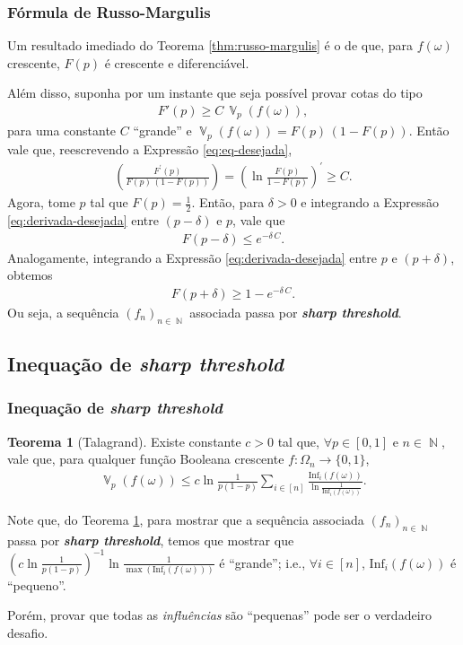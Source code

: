 \documentclass[9pt]{beamer}
\theoremstyle{definition} %
\newtheorem{mythm}{Teorema}
\DeclareMathOperator{\VX}{\mathbb{V}} %
\DeclareMathOperator{\NX}{\mathbb{N}} %
\newcommand{\infl}{\text{Inf}_i(f(\omega))}
\begin{document}
	\begin{frame}[t]
		\frametitle{Fórmula de Russo-Margulis}	
		Um resultado imediado do Teorema \ref{thm:russo-margulis} é o de que, para $f(\omega)$ crescente, $F(p)$ é crescente e diferenciável.
		
		Além disso, suponha por um instante que seja possível provar cotas do tipo
		\begin{align}\label{eq:eq-desejada}
		F'(p) \geq C \, \VX_p(f(\omega)),
		\end{align}
		para uma constante $C$ ``grande'' e $\VX_p(f(\omega)) = F(p) \, (1 - F(p))$. Então vale que, reescrevendo a Expressão \ref{eq:eq-desejada},
		\begin{align}\label{eq:derivada-desejada}
		\left(\frac{F^{\prime}(p)}{F(p) \, (1 - F(p))}\right) = \left(\ln \frac{F(p)}{1 - F(p)}\right)^{\prime} \geq C.
		\end{align}
		\pause
		Agora, tome $p$ tal que $F(p) = \frac{1}{2}$. Então, para $\delta > 0$ e integrando a Expressão \ref{eq:derivada-desejada} entre $(p - \delta)$ e $p$, vale que
		\begin{align*}
			F(p - \delta) \leq e^{-\delta \, C} .
		\end{align*}
		Analogamente, integrando a Expressão \ref{eq:derivada-desejada} entre $p$ e $(p + \delta)$, obtemos
		\begin{align*}
			F(p + \delta) \geq 1 - e^{-\delta \, C}.
		\end{align*}
		Ou seja, a sequência $(f_n)_{n \in \NX}$ associada passa por \textit{\textbf{sharp threshold}}.
	\end{frame}

	\subsection{Inequação de \textit{\textbf{sharp threshold}}}
	\begin{frame}[t]
		\frametitle{Inequação de \textit{\textbf{sharp threshold}}}
		\begin{mythm}[Talagrand]\label{thm:talagrand}
			Existe constante $c > 0$ tal que, $\forall p \in [0,1]$ e $n \in \NX$, vale que, para qualquer função Booleana crescente $f: \Omega_n \to \{0,1\}$,
			\begin{align*}
			\VX_p(f(\omega)) \leq c \ln\frac{1}{p(1-p)} \sum_{i \in [n]} \frac{\infl}{\ln\frac{1}{\infl}}.
			\end{align*}
			\label{talagrand}
		\end{mythm}
		\vspace{-3pt}
		Note que, do Teorema \ref{thm:talagrand}, para mostrar que a sequência associada $(f_n)_{n\in\NX}$ passa por \textit{\textbf{sharp threshold}}, temos que mostrar que $\left(c \ln\frac{1}{p(1-p)}\right)^{-1}\ln\frac{1}{\max(\infl)}$ é ``grande''; i.e., $\forall i \in [n]$, $\infl$ é ``pequeno''.
		
		Porém, provar que todas as \textit{influências} são ``pequenas'' pode ser o verdadeiro desafio.
	\end{frame}
	
\end{document}
